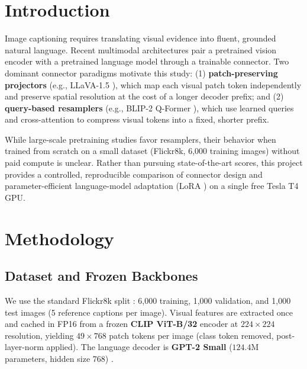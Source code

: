 \documentclass[conference]{IEEEtran}
\begin{document}
\section{Introduction}
Image captioning requires translating visual evidence into fluent, grounded natural language. Recent multimodal architectures pair a pretrained vision encoder with a pretrained language model through a trainable connector. Two dominant connector paradigms motivate this study: (1) \textbf{patch-preserving projectors} (e.g., LLaVA-1.5 \cite{liu2024improved}), which map each visual patch token independently and preserve spatial resolution at the cost of a longer decoder prefix; and (2) \textbf{query-based resamplers} (e.g., BLIP-2 Q-Former \cite{li2023blip2}), which use learned queries and cross-attention to compress visual tokens into a fixed, shorter prefix.

While large-scale pretraining studies favor resamplers, their behavior when trained from scratch on a small dataset (Flickr8k, 6,000 training images) without paid compute is unclear. Rather than pursuing state-of-the-art scores, this project provides a controlled, reproducible comparison of connector design and parameter-efficient language-model adaptation (LoRA \cite{hu2022lora}) on a single free Tesla T4 GPU.

\section{Methodology}

\subsection{Dataset and Frozen Backbones}
We use the standard Flickr8k split \cite{hodosh2013framing}: 6,000 training, 1,000 validation, and 1,000 test images (5 reference captions per image). Visual features are extracted once and cached in FP16 from a frozen \textbf{CLIP ViT-B/32} encoder \cite{radford2021learning} at $224 \times 224$ resolution, yielding $49 \times 768$ patch tokens per image (class token removed, post-layer-norm applied). The language decoder is \textbf{GPT-2 Small} ($124.4\text{M}$ parameters, hidden size 768) \cite{radford2019language}.
\end{document}
